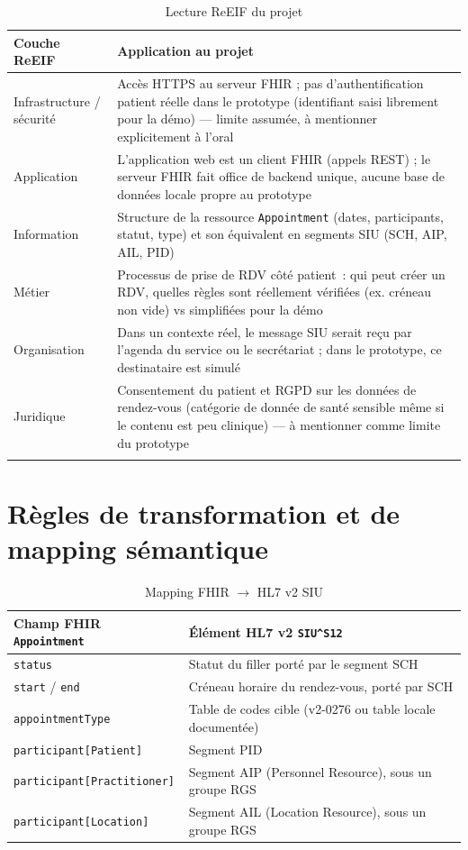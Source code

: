 \documentclass[11pt,a4paper]{article}
\newcommand{\siu}{SIU\textasciicircum{}S12}
\begin{document}
\begin{longtable}{p{3.2cm}p{10.5cm}}
\toprule
\textbf{Couche ReEIF} & \textbf{Application au projet} \\
\midrule
\endhead
Infrastructure / s\'ecurit\'e & Acc\`es HTTPS au serveur FHIR ; pas d'authentification patient r\'eelle dans le prototype (identifiant saisi librement pour la d\'emo) --- limite assum\'ee, \`a mentionner explicitement \`a l'oral \\
Application & L'application web est un client FHIR (appels REST) ; le serveur FHIR fait office de backend unique, aucune base de donn\'ees locale propre au prototype \\
Information & Structure de la ressource \texttt{Appointment} (dates, participants, statut, type) et son \'equivalent en segments SIU (SCH, AIP, AIL, PID) \\
M\'etier & Processus de prise de RDV c\^ot\'e patient~: qui peut cr\'eer un RDV, quelles r\`egles sont r\'eellement v\'erifi\'ees (ex. cr\'eneau non vide) vs simplifi\'ees pour la d\'emo \\
Organisation & Dans un contexte r\'eel, le message SIU serait re\c{c}u par l'agenda du service ou le secr\'etariat ; dans le prototype, ce destinataire est simul\'e \\
Juridique & Consentement du patient et RGPD sur les donn\'ees de rendez-vous (cat\'egorie de donn\'ee de sant\'e sensible m\^eme si le contenu est peu clinique) --- \`a mentionner comme limite du prototype \\
\bottomrule
\caption{Lecture ReEIF du projet}
\end{longtable}

\section{R\`egles de transformation et de mapping s\'emantique}

\begin{table}[h!]
\centering
\renewcommand{\arraystretch}{1.5}
\begin{tabular}{p{5.5cm}p{7.5cm}}
\toprule
\textbf{Champ FHIR \texttt{Appointment}} & \textbf{\'El\'ement HL7 v2 \texttt{\siu}} \\
\midrule
\texttt{status} & Statut du filler port\'e par le segment SCH \\
\texttt{start} / \texttt{end} & Cr\'eneau horaire du rendez-vous, port\'e par SCH \\
\texttt{appointmentType} & Table de codes cible (v2-0276 ou table locale document\'ee) \\
\texttt{participant[Patient]} & Segment PID \\
\texttt{participant[Practitioner]} & Segment AIP (Personnel Resource), sous un groupe RGS \\
\texttt{participant[Location]} & Segment AIL (Location Resource), sous un groupe RGS \\
\bottomrule
\end{tabular}
\caption{Mapping FHIR \texorpdfstring{$\rightarrow$}{->} HL7 v2 SIU}
\end{table}
\end{document}
